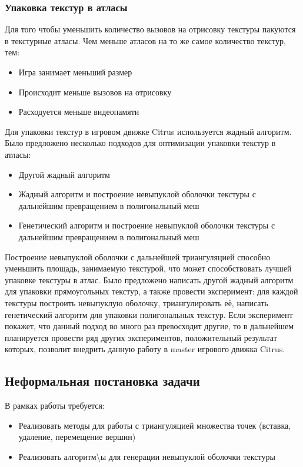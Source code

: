 \documentclass{fefu}
\begin{document}
\subsubsection{Упаковка текстур в атласы}
Для того чтобы уменьшить количество вызовов на отрисовку текстуры пакуются в текстурные атласы. Чем меньше атласов на 
то же самое количество текстур, тем:
\begin{itemize}
    \item Игра занимает меньший размер
    \item Происходит меньше вызовов на отрисовку
    \item Расходуется меньше видеопамяти
\end{itemize}
Для упаковки текстур в игровом движке Citrus используется жадный алгоритм. Было предложено несколько подходов для 
оптимизации упаковки текстур в атласы:
\begin{itemize}
    \item Другой жадный алгоритм
    \item Жадный алгоритм и построение невыпуклой оболочки текстуры с дальнейшим превращением в полигональный меш
    \item Генетический алгоритм и построение невыпуклой оболочки текстуры с дальнейшим превращением в полигональный меш
\end{itemize}
Построение невыпуклой оболочки с дальнейшей триангуляцией способно уменьшить площадь, занимаемую текстурой, что 
может способствовать лучшей упаковке текстуры в атлас. Было предложено написать другой жадный алгоритм для упаковки 
прямоугольных текстур, а также провести эксперимент: для каждой текстуры построить невыпуклую оболочку, триангулировать 
её, написать генетический алгоритм для упаковки полигональных текстур. Если эксперимент покажет, что данный подход во 
много раз превосходит другие, то в дальнейшем планируется провести ряд других экспериментов, положительный результат 
которых, позволит внедрить данную работу в master игрового движка Citrus.
\subsection{Неформальная постановка задачи}
В рамках работы требуется:
\begin{itemize}
    \item Реализовать методы для работы с триангуляцией множества точек (вставка, удаление, перемещение вершин)
    \item Реализовать алгоритм\textbackslash ы для генерации невыпуклой оболочки текстуры
\end{itemize}
\end{document}
